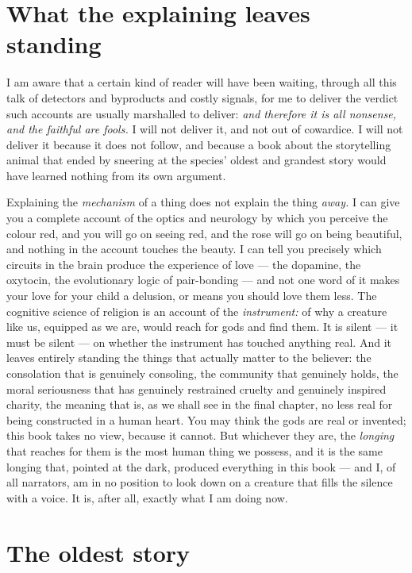 \section*{What the explaining leaves standing}

I am aware that a certain kind of reader will have been waiting, through all this talk of detectors and byproducts and costly signals, for me to deliver the verdict such accounts are usually marshalled to deliver: \emph{and therefore it is all nonsense, and the faithful are fools.} I will not deliver it, and not out of cowardice. I will not deliver it because it does not follow, and because a book about the storytelling animal that ended by sneering at the species' oldest and grandest story would have learned nothing from its own argument.

Explaining the \emph{mechanism} of a thing does not explain the thing \emph{away.} I can give you a complete account of the optics and neurology by which you perceive the colour red, and you will go on seeing red, and the rose will go on being beautiful, and nothing in the account touches the beauty. I can tell you precisely which circuits in the brain produce the experience of love — the dopamine, the oxytocin, the evolutionary logic of pair-bonding — and not one word of it makes your love for your child a delusion, or means you should love them less. The cognitive science of religion is an account of the \emph{instrument:} of why a creature like us, equipped as we are, would reach for gods and find them. It is silent — it must be silent — on whether the instrument has touched anything real. And it leaves entirely standing the things that actually matter to the believer: the consolation that is genuinely consoling, the community that genuinely holds, the moral seriousness that has genuinely restrained cruelty and genuinely inspired charity, the meaning that is, as we shall see in the final chapter, no less real for being constructed in a human heart. You may think the gods are real or invented; this book takes no view, because it cannot. But whichever they are, the \emph{longing} that reaches for them is the most human thing we possess, and it is the same longing that, pointed at the dark, produced everything in this book — and I, of all narrators, am in no position to look down on a creature that fills the silence with a voice. It is, after all, exactly what I am doing now.

\section*{The oldest story}

